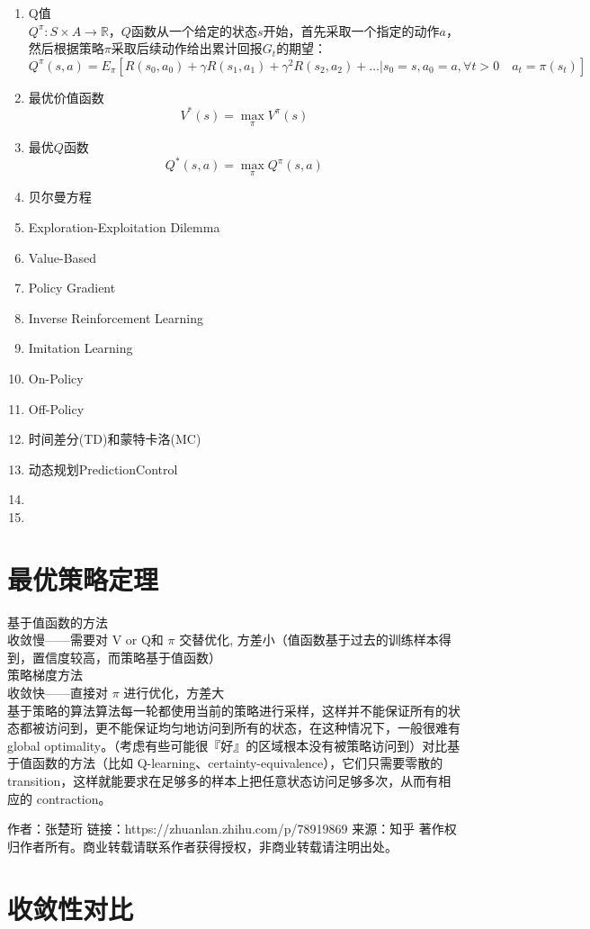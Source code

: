 \documentclass{book}
\begin{document}
\begin{enumerate}
	\item Q值\\
    $Q^{\pi} : S \times A \rightarrow \mathbb{R}$，$Q$函数从一个给定的状态$s$开始，首先采取一个指定的动作$a$，然后根据策略$\pi$采取后续动作给出累计回报$G_{t}$的期望：
    $$Q^{\pi}(s, a)=E_{\pi}\left[R\left(s_{0}, a_{0}\right)+\gamma R\left(s_{1}, a_{1}\right)+\gamma^{2} R\left(s_{2}, a_{2}\right)+\ldots | s_{0}=s, a_{0}=a, \forall t>0 \quad a_{t}=\pi\left(s_{t}\right)\right]$$
	\item 最优价值函数
	$$V^{*}(s)=\underset{\pi} {\max} V^{\pi}(s)$$
	\item 最优$Q$函数
	$$Q^{*}(s, a)=\max _{\pi} Q^{\pi}(s, a)$$
	\item 贝尔曼方程
	\item Exploration-Exploitation Dilemma
	\item Value-Based
	\item Policy Gradient
	\item Inverse Reinforcement Learning
	\item Imitation Learning
	\item On-Policy
	\item Off-Policy
	\item 时间差分(TD)和蒙特卡洛(MC)
	\item 动态规划PredictionControl
	\item
	\item
\end{enumerate}
\section{最优策略定理}
基于值函数的方法\\
收敛慢——需要对 V or Q和 $\pi$ 交替优化,
方差小（值函数基于过去的训练样本得到，置信度较高，而策略基于值函数）\\
策略梯度方法\\
收敛快——直接对 $\pi$ 进行优化，方差大\\
基于策略的算法算法每一轮都使用当前的策略进行采样，这样并不能保证所有的状态都被访问到，更不能保证均匀地访问到所有的状态，在这种情况下，一般很难有 global optimality。（考虑有些可能很『好』的区域根本没有被策略访问到）对比基于值函数的方法（比如 Q-learning、certainty-equivalence），它们只需要零散的 transition，这样就能要求在足够多的样本上把任意状态访问足够多次，从而有相应的 contraction。

作者：张楚珩
链接：https://zhuanlan.zhihu.com/p/78919869
来源：知乎
著作权归作者所有。商业转载请联系作者获得授权，非商业转载请注明出处。
\section{收敛性对比}
\end{document}
